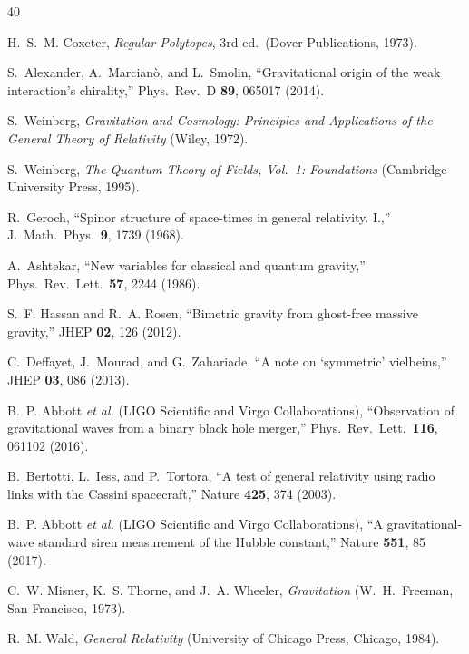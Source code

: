 \documentclass[aps,prd,preprint,superscriptaddress,showpacs,preprintnumbers,amsmath,amssymb,nofootinbib]{revtex4-2}
\begin{document}
\begin{thebibliography}{40}

H.~S.~M. Coxeter, \emph{Regular Polytopes}, 3rd ed.\ (Dover Publications, 1973).

S.~Alexander, A.~Marcian\`o, and L.~Smolin, ``Gravitational origin of the weak interaction's chirality,'' Phys.\ Rev.\ D \textbf{89}, 065017 (2014).

S.~Weinberg, \emph{Gravitation and Cosmology: Principles and Applications of the General Theory of Relativity} (Wiley, 1972).

S.~Weinberg, \emph{The Quantum Theory of Fields, Vol.\ 1: Foundations} (Cambridge University Press, 1995).

R.~Geroch, ``Spinor structure of space-times in general relativity. I.,'' J.\ Math.\ Phys.\ \textbf{9}, 1739 (1968).

A.~Ashtekar, ``New variables for classical and quantum gravity,'' Phys.\ Rev.\ Lett.\ \textbf{57}, 2244 (1986).

S.~F. Hassan and R.~A. Rosen, ``Bimetric gravity from ghost-free massive gravity,'' JHEP \textbf{02}, 126 (2012).

C.~Deffayet, J.~Mourad, and G.~Zahariade, ``A note on `symmetric' vielbeins,'' JHEP \textbf{03}, 086 (2013).

B.~P. Abbott \textit{et al.} (LIGO Scientific and Virgo Collaborations), ``Observation of gravitational waves from a binary black hole merger,'' Phys.\ Rev.\ Lett.\ \textbf{116}, 061102 (2016).

B.~Bertotti, L.~Iess, and P.~Tortora, ``A test of general relativity using radio links with the Cassini spacecraft,'' Nature \textbf{425}, 374 (2003).

B.~P. Abbott \textit{et al.} (LIGO Scientific and Virgo Collaborations), ``A gravitational-wave standard siren measurement of the Hubble constant,'' Nature \textbf{551}, 85 (2017).

C.~W. Misner, K.~S. Thorne, and J.~A. Wheeler, \emph{Gravitation} (W.~H.~Freeman, San Francisco, 1973).

R.~M. Wald, \emph{General Relativity} (University of Chicago Press, Chicago, 1984).


\end{thebibliography}
\end{document}
